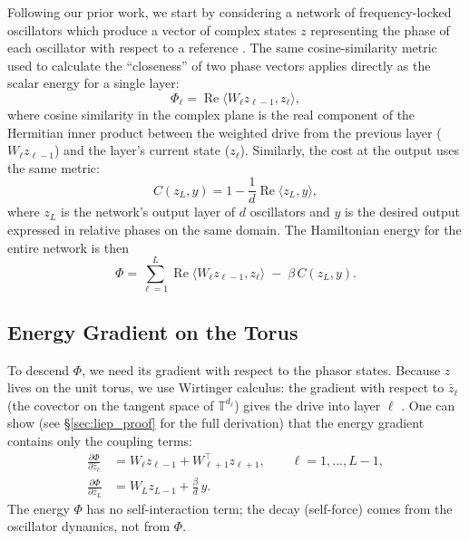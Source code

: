 \documentclass[11pt]{article}
\newcommand{\T}{\mathbb{T}}
\DeclareMathOperator{\Real}{Re}
\begin{document}
Following our prior work, we start by considering a network of frequency-locked oscillators which produce a vector of complex states $z$ representing the phase of each oscillator with respect to a reference \citep{olin2021deep,olin2023hyperdimensional}. The same cosine-similarity metric used to calculate the ``closeness'' of two phase vectors applies directly as the scalar energy for a single layer:
\begin{equation}\label{eq:phasor_layer_energy}
\Phi_\ell = \Real\langle W_\ell z_{\ell-1}, z_\ell \rangle,
\end{equation}
where cosine similarity in the complex plane is the real component of the Hermitian inner product between the weighted drive from the previous layer ($W_\ell z_{\ell-1}$) and the layer's current state ($z_\ell$). Similarly, the cost at the output uses the same metric:
\begin{equation}\label{eq:phasor-cost}
C(z_L, y) = 1 - \frac{1}{d}\Real\langle z_L, y \rangle,
\end{equation}
where $z_L$ is the network's output layer of $d$ oscillators and $y$ is the desired output expressed in relative phases on the same domain. The Hamiltonian energy for the entire network is then
\begin{equation}\label{eq:phasor-energy}
\Phi = \sum_{\ell=1}^L \Real\langle W_\ell z_{\ell-1}, z_\ell \rangle \;-\; \beta\, C(z_L, y).
\end{equation}

\subsection{Energy Gradient on the Torus}\label{ssec:energy-gradient}

To descend $\Phi$, we need its gradient with respect to the phasor states. Because $z$ lives on the unit torus, we use Wirtinger calculus: the gradient with respect to $\bar{z}_\ell$ (the covector on the tangent space of $\T^{d_\ell}$) gives the drive into layer $\ell$ \citep{laborieux2022holomorphic}. One can show (see \S\ref{sec:liep_proof} for the full derivation) that the energy gradient contains only the coupling terms:
\begin{align}
\frac{\partial \Phi}{\partial \bar{z}_\ell} &= W_\ell z_{\ell-1} + W_{\ell+1}^\top z_{\ell+1}, \qquad \ell = 1,\dots,L-1, \label{eq:grad-hidden}\\
\frac{\partial \Phi}{\partial \bar{z}_L} &= W_L z_{L-1} + \frac{\beta}{d}\, y. \label{eq:grad-output}
\end{align}
The energy $\Phi$ has no self-interaction term; the decay (self-force) comes from the oscillator dynamics, not from $\Phi$.
\end{document}
